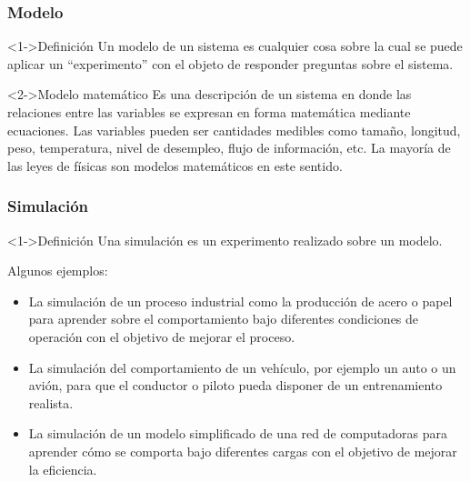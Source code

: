 \begin{frame}
	\frametitle{Modelo}
	\begin{block}<1->{Definición}
		Un modelo de un sistema es cualquier cosa sobre la cual se puede aplicar un “experimento” con el objeto de responder preguntas sobre el sistema.
	\end{block}
	\begin{block}<2->{Modelo matemático}
		Es una descripción de un sistema en donde las relaciones entre las variables se expresan en forma matemática mediante ecuaciones. Las variables pueden ser cantidades medibles como tamaño, longitud, peso, temperatura, nivel de desempleo, flujo de información, etc. La mayoría de las leyes de físicas son modelos matemáticos en este sentido.
	\end{block}
\end{frame}

\begin{frame}
	\frametitle{Simulación}
	\begin{block}<1->{Definición}
		Una simulación es un experimento realizado sobre un modelo.
	\end{block}
    Algunos ejemplos:
	\begin{itemize}
  		\item<1-> La simulación de un proceso industrial como la producción de acero o papel para aprender sobre el comportamiento bajo diferentes condiciones de operación con el objetivo de mejorar el proceso.
        \item<2-> La simulación del comportamiento de un vehículo, por ejemplo un auto o un avión, para que el conductor o piloto pueda disponer de un entrenamiento realista.
        \item<3-> La simulación de un modelo simplificado de una red de computadoras para aprender cómo se comporta bajo diferentes cargas con el objetivo de mejorar la eficiencia.
  	\end{itemize}
\end{frame}

